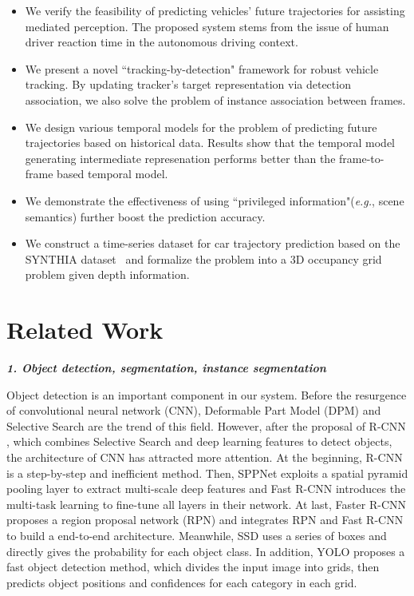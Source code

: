 \documentclass[10pt,twocolumn,letterpaper]{article}
\begin{document}
\begin{itemize}

\item We verify the feasibility of predicting vehicles' future trajectories for assisting mediated perception. The proposed system stems from the issue of human driver reaction time in the autonomous driving context.

\item We present a novel ``tracking-by-detection" framework for robust vehicle tracking. By updating tracker's target representation via detection association, we also solve the problem of instance association between frames.

\item We design various temporal models for the problem of predicting future trajectories based on historical data. Results show that the temporal model generating intermediate represenation performs better than the frame-to-frame based temporal model.

\item We demonstrate the effectiveness of using ``privileged information"(\emph{e.g.}, scene semantics) further boost the prediction accuracy.


\item We construct a time-series dataset for car trajectory prediction based on the SYNTHIA dataset~\cite{ros2016synthia} and  formalize the problem into a 3D occupancy grid problem given depth information.

\end{itemize}



\section{Related Work}

\textbf{\emph{1. Object detection, segmentation, instance segmentation}}

Object detection is an important component in our system. Before the resurgence of convolutional neural network (CNN), Deformable Part Model (DPM) \cite{felzenszwalb2008discriminatively} and Selective Search \cite{Uijlings2013Selective} are the trend of this field. However, after the proposal of R-CNN \cite{girshick2014rich}, which combines Selective Search and deep learning features to detect objects, the architecture of CNN has attracted more attention. At the beginning, R-CNN is a step-by-step and inefficient method. Then, SPPNet \cite{He2015Spatial} exploits a spatial pyramid pooling layer to extract multi-scale deep features and Fast R-CNN \cite{Girshick2015Fast} introduces the multi-task learning to fine-tune all layers in their network. At last, Faster R-CNN \cite{Ren2015Faster} proposes a region proposal network (RPN) and integrates RPN and Fast R-CNN to build a end-to-end architecture. Meanwhile, SSD \cite{liu2016ssd} uses a series of boxes and directly gives the probability for each object class. In addition, YOLO \cite{redmon2016you} proposes a fast object detection method, which divides the input image into grids, then predicts object positions and confidences for each category in each grid.
\end{document}
